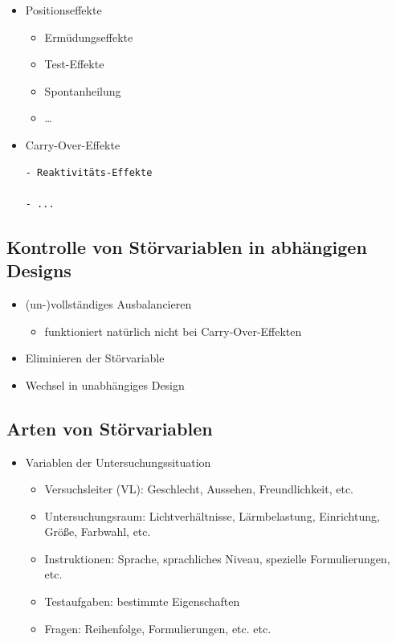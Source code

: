 \documentclass[
]{book}
\providecommand{\tightlist}{%
  \setlength{\itemsep}{0pt}\setlength{\parskip}{0pt}}
\begin{document}
\begin{itemize}
\item
  Positionseffekte

  \begin{itemize}
  \item
    Ermüdungseffekte
  \item
    Test-Effekte
  \item
    Spontanheilung
  \item
    \ldots{}
  \end{itemize}
\item
  Carry-Over-Effekte

\begin{verbatim}
- Reaktivitäts-Effekte

- ...
\end{verbatim}
\end{itemize}

\hypertarget{kontrolle-von-stuxf6rvariablen-in-abhuxe4ngigen-designs}{%
\subsection{Kontrolle von Störvariablen in abhängigen Designs}\label{kontrolle-von-stuxf6rvariablen-in-abhuxe4ngigen-designs}}

\begin{itemize}
\item
  (un-)vollständiges Ausbalancieren

  \begin{itemize}
  \tightlist
  \item
    funktioniert natürlich nicht bei Carry-Over-Effekten
  \end{itemize}
\item
  Eliminieren der Störvariable
\item
  Wechsel in unabhängiges Design
\end{itemize}

\hypertarget{arten-von-stuxf6rvariablen-1}{%
\subsection{Arten von Störvariablen}\label{arten-von-stuxf6rvariablen-1}}

\begin{itemize}
\item
  Variablen der Untersuchungssituation

  \begin{itemize}
  \item
    Versuchsleiter (VL): Geschlecht, Aussehen, Freundlichkeit, etc.
  \item
    Untersuchungsraum: Lichtverhältnisse, Lärmbelastung, Einrichtung, Größe, Farbwahl, etc.
  \item
    Instruktionen: Sprache, sprachliches Niveau, spezielle Formulierungen, etc.
  \item
    Testaufgaben: bestimmte Eigenschaften
  \item
    Fragen: Reihenfolge, Formulierungen, etc. etc.
  \end{itemize}
\end{itemize}
\end{document}
